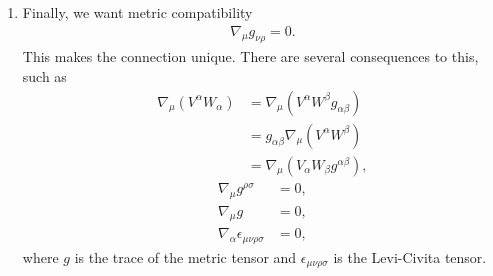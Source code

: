 \documentclass[10pt]{article}
\begin{document}
\begin{enumerate}
        \item Finally, we want metric compatibility
        \begin{align}
            \nabla_{\mu} g_{\nu \rho} = 0.
        \end{align}
        This makes the connection unique. There are several consequences to this, such as
        \begin{align*}
            \nabla_{\mu} \left(V^{\alpha} W_{\alpha} \right) &= \nabla_{\mu} \left(V^{\alpha} W^{\beta} g_{\alpha \beta} \right)\\
            &= g_{\alpha \beta} \nabla_{\mu} \left(V^{\alpha} W^{\beta} \right)\\
            &= \nabla_{\mu} \left(V_{\alpha} W_{\beta} g^{\alpha \beta} \right),
        \end{align*}
        \begin{align*}
            \nabla_{\mu} g^{\rho \sigma} &= 0,\\
            \nabla_{\mu} g &= 0,\\
            \nabla_{\alpha} \epsilon_{\mu \nu \rho \sigma} &= 0,
        \end{align*}
        where $g$ is the trace of the metric tensor and $\epsilon_{\mu \nu \rho \sigma}$ is the Levi-Civita tensor.
    \end{enumerate}
    
\end{document}
